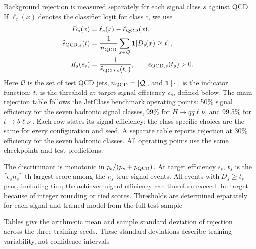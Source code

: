Background rejection is measured separately for each signal class $s$ against
QCD. If $\ell_c(x)$ denotes the classifier logit for class $c$, we use
\begin{equation}
 \begin{aligned}
 D_s(x)&=\ell_s(x)-\ell_{\mathrm{QCD}}(x),\\
 \widehat\epsilon_{\mathrm{QCD},s}(t)
   &=\frac{1}{n_{\mathrm{QCD}}}\sum_{x\in\mathcal Q}
      \mathbf{1}\!\left[D_s(x)\geq t\right],\\
 R_s(\epsilon_s)&=\frac{1}{\widehat\epsilon_{\mathrm{QCD},s}(t_s)},
 \qquad \widehat\epsilon_{\mathrm{QCD},s}(t_s)>0.
 \end{aligned}
 \label{eq:rejection}
\end{equation}
Here $\mathcal Q$ is the set of test QCD jets, $n_{\mathrm{QCD}}=|\mathcal Q|$,
and $\mathbf{1}[\cdot]$ is the indicator function; $t_s$ is the threshold at
target signal efficiency $\epsilon_s$, defined below.
The main rejection table follows the JetClass benchmark operating points:
50\% signal efficiency for the seven hadronic signal classes, 99\% for
$H\to q\bar q\ell\nu$, and 99.5\% for $t\to b\ell\nu$
\citep{Qu2022ParticleTransformer}. Each row states its signal efficiency;
the class-specific choices are the same for every configuration and seed.
A separate table reports rejection at 30\% efficiency for the seven hadronic
classes. All operating points use the same checkpoints and test predictions.

The discriminant is monotonic in $p_s/(p_s+p_{\mathrm{QCD}})$. At target efficiency
$\epsilon_s$, $t_s$ is the
$\lceil\epsilon_s n_s\rceil$-th largest score among the $n_s$ true signal events.
All events with $D_s\geq t_s$ pass, including ties; the achieved signal efficiency
can therefore exceed the target because of integer rounding or tied scores.
Thresholds are determined separately for each signal and trained model from
the full test sample.

Tables give the arithmetic mean and sample standard deviation of rejection
across the three training seeds. These standard deviations describe training
variability, not confidence intervals.
